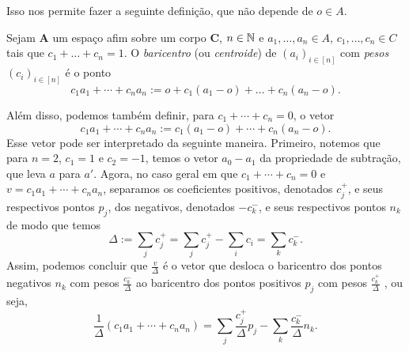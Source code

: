 Isso nos permite fazer a seguinte definição, que não depende de $o \in A$.

\begin{definition}
Sejam $\bm A$ um espaço afim sobre um corpo $\bm C$, $n \in \mathbb{N}$ e $a_1,\ldots,a_n \in A$, $c_1,\ldots,c_n \in C$ tais que $c_1+\ldots+c_n = 1$. O \emph{baricentro} (ou \emph{centroide}) de $(a_i)_{i \in [n]}$ com \emph{pesos} $(c_i)_{i \in [n]}$ é o ponto
	\begin{equation*}
		c_1 a_1 + \cdots + c_n a_n := o + c_1(a_1-o) + \ldots + c_n(a_n-o).
	\end{equation*}
\end{definition}

Além disso, podemos também definir, para $c_1+\cdots+c_n=0$, o vetor
	\begin{equation*}
		c_1 a_1 + \cdots + c_n a_n := c_1(a_1-o) + \cdots + c_n(a_n-o).
	\end{equation*}
Esse vetor pode ser interpretado da seguinte maneira. Primeiro, notemos que para $n=2$, $c_1=1$ e $c_2=-1$, temos o vetor $a_0-a_1$ da propriedade de subtração, que leva $a$ para $a'$. Agora, no caso geral em que $c_1+\cdots+c_n=0$ e $v=c_1 a_1 + \cdots + c_n a_n$, separamos os coeficientes positivos, denotados $c^+_j$, e seus respectivos pontos $p_j$, dos negativos, denotados $-c^-_k$, e seus respectivos pontos $n_k$ de modo que temos
	\begin{equation*}
		\Delta := \sum_j c^+_j = \sum_j c^+_j - \sum_i c_i = \sum_k c^-_k.
	\end{equation*}
Assim, podemos concluir que $\frac{v}{\Delta}$ é o vetor que desloca o baricentro dos pontos negativos $n_k$ com pesos $\frac{c^-_k}{\Delta}$ ao baricentro dos pontos positivos $p_j$ com pesos $\frac{c^+_k}{\Delta}$ , ou seja,
	\begin{equation*}
		\frac{1}{\Delta} (c_1 a_1 + \cdots + c_n a_n) = \sum_j \frac{c^+_j}{\Delta} p_j - \sum_k \frac{c^-_k}{\Delta} n_k.
	\end{equation*}

